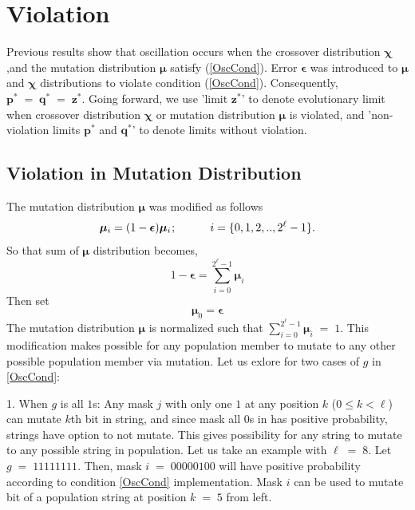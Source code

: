 \section{Violation}
Previous results show that oscillation occurs when the crossover distribution $\bm{\chi}$ ,and the mutation distribution $\bm{\mu}$ 
satisfy (\ref{OscCond}). Error $\bm{\epsilon}$ was introduced to $\bm{\mu}$ and $\bm{\chi}$ distributions to 
violate condition (\ref{OscCond}). Consequently, $\bm{p}^\ast \;=\; \bm{q}^\ast \;=\; \bm{z}^\ast$. 
Going forward, we use 'limit $\bm{z}^\ast$' to denote evolutionary limit when crossover distribution 
$\bm{\chi}$ or mutation distribution $\bm{\mu}$ is violated, and 
'non-violation limits $\bm{p}^\ast$ and $\bm{q}^\ast$' to denote limits without violation.

\subsection{Violation in Mutation Distribution}
The mutation distribution $\bm{\mu}$ was modified as follows
\[
\bm{\mu}_i = (1-\bm{\epsilon}) \bm{\mu}_i \hspace{0.01in}; \hspace{30pt} i = \{0, 1, 2,.., 2^{\ell}-1\}.
\]
So that sum of $\bm{\mu}$ distribution becomes, 
\[
1-\bm{\epsilon} = \sum \limits_{i=0}^{2^{\ell}-1} \bm{\mu}_i
\]
Then set
\[
\bm{\mu}_0 = \bm{\epsilon}
\]
The mutation distribution $\bm{\mu}$ is normalized such that  $\sum\limits_{i=0}^{2^{\ell}-1}\bm{\mu}_i \;=\; 1$.
This modification makes possible for any population member to mutate to any other possible population member via mutation. 
Let us exlore for two cases of $g$ in \ref{OscCond}:

1. When $g$ is all $1$s:\newline
Any mask $j$ with only one $1$ at any position $k$ ($0 \leq k < \ell$) can mutate $k$th bit in string, and since mask 
all $0$s in has positive probability, strings have option to not mutate. This gives possibility for any string to mutate to 
any possible string in population. Let us take an example with $\ell \;=\; 8$. Let $g \;=\; 11111111$. Then, mask 
$i \;=\; 00000100$ will have positive probability according to condition \ref{OscCond} implementation. 
Mask $i$ can be used to mutate bit of a population string at position $k \;=\; 5$ from left.

